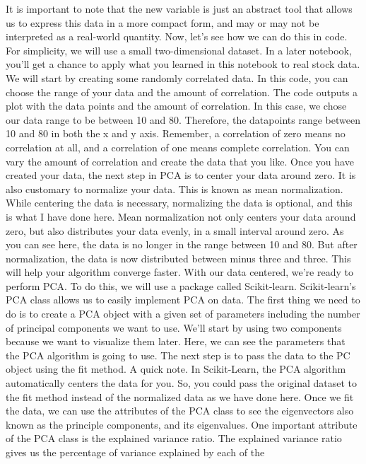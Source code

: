 It is important to note that the new variable is just an abstract tool
that allows us to express this data in a more compact form, and may or
may not be interpreted as a real-world quantity. Now, let's see how we
can do this in code. For simplicity, we will use a small two-dimensional
dataset. In a later notebook, you'll get a chance to apply what you
learned in this notebook to real stock data. We will start by creating
some randomly correlated data. In this code, you can choose the range of
your data and the amount of correlation. The code outputs a plot with
the data points and the amount of correlation. In this case, we chose
our data range to be between 10 and 80. Therefore, the datapoints range
between 10 and 80 in both the x and y axis. Remember, a correlation of
zero means no correlation at all, and a correlation of one means
complete correlation. You can vary the amount of correlation and create
the data that you like. Once you have created your data, the next step
in PCA is to center your data around zero. It is also customary to
normalize your data. This is known as mean normalization. While
centering the data is necessary, normalizing the data is optional, and
this is what I have done here. Mean normalization not only centers your
data around zero, but also distributes your data evenly, in a small
interval around zero. As you can see here, the data is no longer in the
range between 10 and 80. But after normalization, the data is now
distributed between minus three and three. This will help your algorithm
converge faster. With our data centered, we're ready to perform PCA. To
do this, we will use a package called Scikit-learn. Scikit-learn's PCA
class allows us to easily implement PCA on data. The first thing we need
to do is to create a PCA object with a given set of parameters including
the number of principal components we want to use. We'll start by using
two components because we want to visualize them later. Here, we can see
the parameters that the PCA algorithm is going to use. The next step is
to pass the data to the PC object using the fit method. A quick note. In
Scikit-Learn, the PCA algorithm automatically centers the data for you.
So, you could pass the original dataset to the fit method instead of the
normalized data as we have done here. Once we fit the data, we can use
the attributes of the PCA class to see the eigenvectors also known as
the principle components, and its eigenvalues. One important attribute
of the PCA class is the explained variance ratio. The explained variance
ratio gives us the percentage of variance explained by each of the
